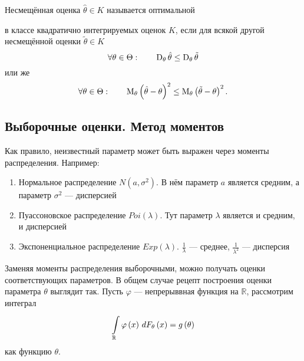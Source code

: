 \begin{definition}Несмещённая оценка $\hat{\theta}\in K$
называется оптимальной
\begin{comment}
\footnote{В учебнике Боровкова А. А.
``Математическая статистика'' оценка, удовлетворяющая этим условиям,
носит название \textbf{эффективная оценка} \cite[стр.~130]{BorovkovMS},
но у нас этот термин будет использоваться далее в другом смысле}
\end{comment}
в классе квадратично интегрируемых оценок $K$,
если для всякой другой несмещённой оценки $\tilde{\theta}\in K$
\begin{equation*}
  \forall\theta\in\Theta:\qquad
  \dispersionof{\theta}{\hat{\theta}} \le \dispersionof{\theta}{\tilde{\theta}}
\end{equation*}
или же
\begin{equation*}
  \forall\theta\in\Theta:\qquad
  \meanof{\theta}{\left(\hat{\theta} - \theta\right)^2}
  \le \meanof{\theta}{\left( \tilde{\theta} - \theta \right)^2}.
\end{equation*}
\end{definition}

\subsection{Выборочные оценки. Метод моментов}
Как правило, неизвестный параметр может быть выражен через моменты
распределения. Например:

\begin{enumerate}
  \item Нормальное распределение $N\left(a,\sigma^2\right)$.
    В нём параметр $a$ является средним,
    а параметр $\sigma^2$ --- дисперсией
  \item Пуассоновское распределение $Poi\left(\lambda\right)$.
    Тут параметр $\lambda$ является и средним, и дисперсией
  \item Экспоненциальное распределение $Exp\left(\lambda\right)$.
    $\frac{1}{\lambda}$ --- среднее,
    $\frac{1}{\lambda^2}$ --- дисперсия
\end{enumerate}

Заменяя моменты распределения выборочными, можно получать оценки
соответствующих параметров.
В общем случае рецепт построения оценки параметра $\theta$ выглядит так.
Пусть $\varphi$ --- непрерыввная функция на $\mathbb{R}$, рассмотрим интеграл
\begin{equation*}
  \integrall{\mathbb{R}}{d\cdfof{\theta}{x}}{\varphi\left( x \right)}
  = g\left( \theta \right)
\end{equation*}
как функцию $\theta$.

